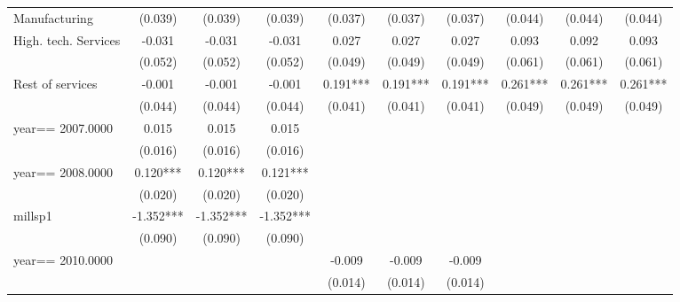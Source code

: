 \begin{table}[htbp]
\begin{tabular}{l*{9}{c}}
Manufacturing       &     (0.039)   &     (0.039)   &     (0.039)   &     (0.037)   &     (0.037)   &     (0.037)   &     (0.044)   &     (0.044)   &     (0.044)   \\
High. tech. Services&      -0.031   &      -0.031   &      -0.031   &       0.027   &       0.027   &       0.027   &       0.093   &       0.092   &       0.093   \\
                    &     (0.052)   &     (0.052)   &     (0.052)   &     (0.049)   &     (0.049)   &     (0.049)   &     (0.061)   &     (0.061)   &     (0.061)   \\
Rest of services    &      -0.001   &      -0.001   &      -0.001   &       0.191***&       0.191***&       0.191***&       0.261***&       0.261***&       0.261***\\
                    &     (0.044)   &     (0.044)   &     (0.044)   &     (0.041)   &     (0.041)   &     (0.041)   &     (0.049)   &     (0.049)   &     (0.049)   \\
year==  2007.0000   &       0.015   &       0.015   &       0.015   &               &               &               &               &               &               \\
                    &     (0.016)   &     (0.016)   &     (0.016)   &               &               &               &               &               &               \\
year==  2008.0000   &       0.120***&       0.120***&       0.121***&               &               &               &               &               &               \\
                    &     (0.020)   &     (0.020)   &     (0.020)   &               &               &               &               &               &               \\
millsp1             &      -1.352***&      -1.352***&      -1.352***&               &               &               &               &               &               \\
                    &     (0.090)   &     (0.090)   &     (0.090)   &               &               &               &               &               &               \\
year==  2010.0000   &               &               &               &      -0.009   &      -0.009   &      -0.009   &               &               &               \\
                    &               &               &               &     (0.014)   &     (0.014)   &     (0.014)   &               &               &               \\

\end{tabular}
\end{table}
